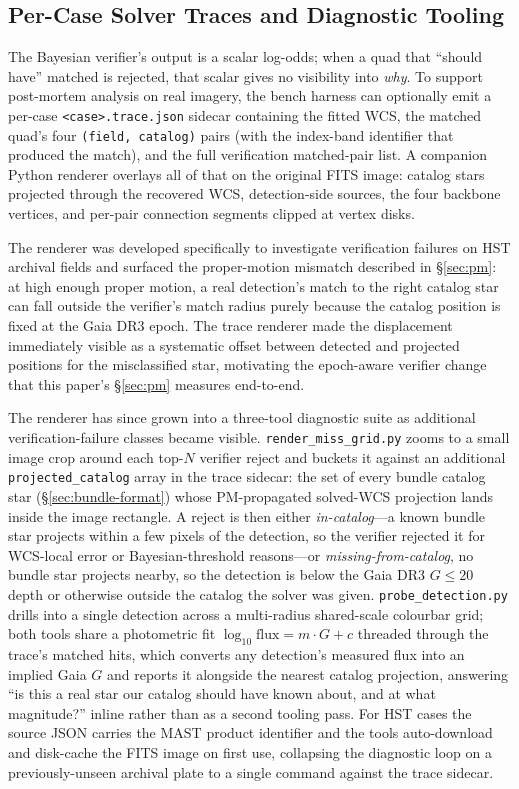 \documentclass[twocolumn, 10pt]{article}
\begin{document}
\subsection{Per-Case Solver Traces and Diagnostic Tooling}
\label{sec:solver-trace}

The Bayesian verifier's output is a scalar log-odds; when a quad
that ``should have'' matched is rejected, that scalar gives no
visibility into \emph{why}. To support post-mortem analysis on real
imagery, the bench harness can optionally emit a per-case
\texttt{<case>.trace.json} sidecar containing the fitted WCS, the
matched quad's four \texttt{(field, catalog)} pairs (with the
index-band identifier that produced the match), and the full
verification matched-pair list. A companion Python renderer overlays
all of that on the original FITS image: catalog stars projected
through the recovered WCS, detection-side sources, the four backbone
vertices, and per-pair connection segments clipped at vertex disks.

The renderer was developed specifically to investigate verification
failures on HST archival fields and surfaced the proper-motion
mismatch described in \S\ref{sec:pm}: at high enough proper motion,
a real detection's match to the right catalog star can fall outside
the verifier's match radius purely because the catalog position is
fixed at the Gaia DR3 epoch. The trace renderer made the
displacement immediately visible as a systematic offset between
detected and projected positions for the misclassified star,
motivating the epoch-aware verifier change that this paper's
\S\ref{sec:pm} measures end-to-end.

The renderer has since grown into a three-tool diagnostic suite as
additional verification-failure classes became visible.
\texttt{render\_miss\_grid.py} zooms to a small image crop around
each top-$N$ verifier reject and buckets it against an additional
\texttt{projected\_catalog} array in the trace sidecar: the set of
every bundle catalog star (\S\ref{sec:bundle-format}) whose
PM-propagated solved-WCS projection lands inside the image rectangle.
A reject is then either \emph{in-catalog}---a known bundle star
projects within a few pixels of the detection, so the verifier
rejected it for WCS-local error or Bayesian-threshold reasons---or
\emph{missing-from-catalog}, no bundle star projects nearby, so the
detection is below the Gaia DR3 $G \le 20$ depth or otherwise outside
the catalog the solver was given. \texttt{probe\_detection.py}
drills into a single detection across a multi-radius shared-scale
colourbar grid; both tools share a photometric fit
$\log_{10}\!\text{flux} = m \cdot G + c$ threaded through the trace's
matched hits, which converts any detection's measured flux into an
implied Gaia $G$ and reports it alongside the nearest catalog
projection, answering ``is this a real star our catalog should have
known about, and at what magnitude?'' inline rather than as a second
tooling pass. For HST cases the source JSON carries the MAST product
identifier and the tools auto-download and disk-cache the FITS image
on first use, collapsing the diagnostic loop on a previously-unseen
archival plate to a single command against the trace sidecar.
\end{document}
